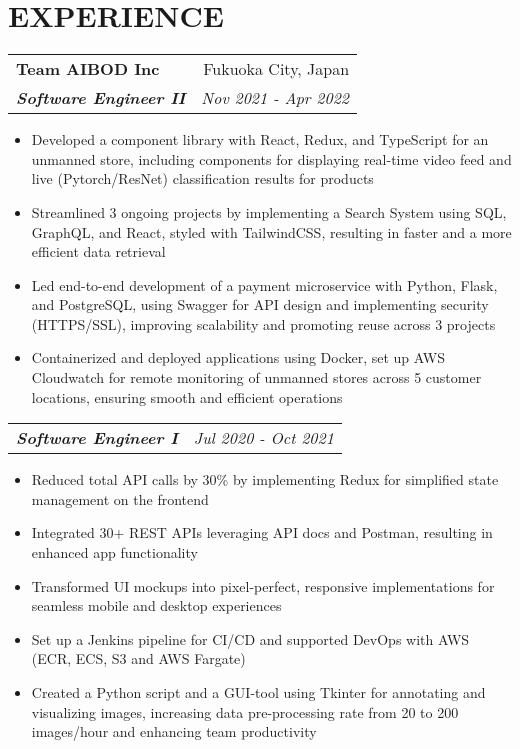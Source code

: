 \documentclass[letterpaper]{article}
\makeatletter
\newcommand{\resumeItemWithoutTitle}[1]{
  \item{
    {#1 \vspace{-4pt}}
  }
}
\newcommand{\resumeSubheadingWithoutTitle}[2]{
  \begin{tabular*}{\textwidth}{l@{\extracolsep{\fill}}r}
        \textbf{\textit{#1}} & \textit{ #2} \\
    \end{tabular*}\vspace{-15pt}
}
\newcommand{\resumeSubheading}[4]{
    \begin{tabular*}{\textwidth}{l@{\extracolsep{\fill}}r}
        \textbf{#1} & #2 \\
        \textbf{\textit{#3}} & \textit{ #4} \\
    \end{tabular*}\vspace{-10pt}
}
\newcommand{\shortSection}[1]{
    \vspace{-6pt}
    \section{#1}
}
\newcommand{\resumeItemListStart}{\begin{itemize}}
\newcommand{\resumeItemListEnd}{\end{itemize}}
\makeatother
\begin{document}
\shortSection{EXPERIENCE}
\resumeSubheading
{Team AIBOD Inc}{Fukuoka City, Japan}
{Software Engineer II}{Nov 2021 - Apr 2022}
\vspace{2pt}
\resumeItemListStart
\resumeItemWithoutTitle{Developed a component library with React, Redux, and TypeScript for an unmanned store, including components for displaying real-time video feed and live (Pytorch/ResNet) classification results for products}
\resumeItemWithoutTitle{Streamlined 3 ongoing projects by implementing a Search System using SQL, GraphQL, and React, styled with TailwindCSS, resulting in faster and a more efficient data retrieval}
\resumeItemWithoutTitle{Led end-to-end development of a payment microservice with Python, Flask, and PostgreSQL, using Swagger for API design and implementing security (HTTPS/SSL), improving scalability and promoting reuse across 3 projects}
\resumeItemWithoutTitle{Containerized and deployed applications using Docker, set up AWS Cloudwatch for remote monitoring of unmanned stores across 5 customer locations, ensuring smooth and efficient operations}
\resumeItemListEnd

\vspace{2pt}
\resumeSubheadingWithoutTitle
{Software Engineer I}{Jul 2020 - Oct 2021}
\vspace{0pt}
\resumeItemListStart
\resumeItemWithoutTitle{Reduced total API calls by 30\% by implementing Redux for simplified state management on the frontend}
\resumeItemWithoutTitle{Integrated 30+ REST APIs leveraging API docs and Postman, resulting in enhanced app functionality}
\resumeItemWithoutTitle{Transformed UI mockups into pixel-perfect, responsive implementations for seamless mobile and desktop experiences}
\resumeItemWithoutTitle{Set up a Jenkins pipeline for CI/CD and supported DevOps with AWS (ECR, ECS, S3 and AWS Fargate)}
\resumeItemWithoutTitle{Created a Python script and a GUI-tool using Tkinter for annotating and visualizing images, increasing data pre-processing rate from 20 to 200 images/hour and enhancing team productivity}
\resumeItemListEnd
\end{document}
